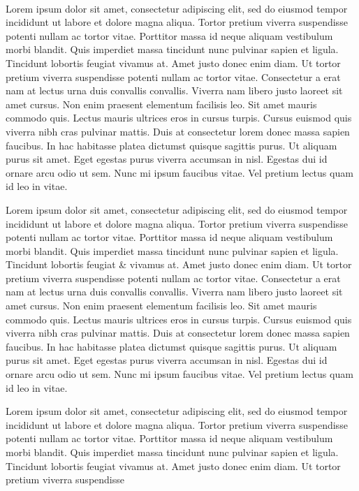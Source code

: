 \paragraph{}
Lorem ipsum dolor sit amet, consectetur adipiscing elit, sed do eiusmod
tempor incididunt ut labore et dolore magna aliqua. Tortor pretium
viverra suspendisse potenti nullam ac tortor vitae. Porttitor massa id
neque aliquam vestibulum morbi blandit\footnotemark. Quis imperdiet massa tincidunt
nunc pulvinar sapien et ligula. Tincidunt lobortis feugiat vivamus
at. Amet justo donec enim diam. Ut tortor pretium viverra suspendisse
potenti nullam ac tortor vitae. Consectetur a erat nam at lectus urna
duis convallis convallis. Viverra nam libero justo laoreet sit amet
cursus. Non enim praesent elementum facilisis leo. Sit amet mauris
commodo quis. Lectus mauris ultrices eros in cursus turpis. Cursus euismod
quis viverra nibh cras pulvinar mattis. Duis at consectetur lorem donec
massa sapien faucibus. In hac habitasse platea dictumst quisque sagittis
purus. Ut aliquam purus sit amet. Eget egestas purus viverra accumsan
in nisl. Egestas dui id ornare arcu odio ut sem. Nunc mi ipsum faucibus
vitae. Vel pretium lectus quam id leo in vitae.

\clearpage


Lorem ipsum dolor sit amet, consectetur adipiscing elit, sed do eiusmod
tempor incididunt ut labore et dolore magna aliqua. Tortor pretium
viverra suspendisse potenti nullam ac tortor vitae. Porttitor massa id
neque aliquam vestibulum morbi blandit. Quis imperdiet massa tincidunt
nunc pulvinar sapien et ligula. Tincidunt lobortis feugiat \& vivamus
at. Amet justo donec enim diam. Ut tortor pretium viverra suspendisse
potenti nullam ac tortor vitae. Consectetur a erat nam at lectus urna
duis convallis convallis. Viverra nam libero justo laoreet sit amet
cursus. Non enim praesent elementum facilisis leo\footnotemark. Sit amet mauris
commodo quis. Lectus mauris ultrices eros in cursus turpis. Cursus euismod
quis viverra nibh cras pulvinar mattis. Duis at consectetur lorem donec
massa sapien faucibus. In hac habitasse platea dictumst quisque sagittis
purus. Ut aliquam purus sit amet. Eget egestas purus viverra accumsan
in nisl. Egestas dui id ornare arcu odio ut sem. Nunc mi ipsum faucibus
vitae. Vel pretium lectus quam id leo in vitae.


Lorem ipsum dolor sit amet, consectetur adipiscing elit, sed do eiusmod
tempor incididunt ut labore et dolore magna aliqua. Tortor pretium
viverra suspendisse potenti nullam ac tortor vitae. Porttitor massa id
neque aliquam vestibulum morbi blandit. Quis imperdiet massa tincidunt
nunc pulvinar sapien et ligula. Tincidunt lobortis feugiat vivamus
at. Amet justo donec enim diam. Ut tortor pretium viverra suspendisse

\clearpage

